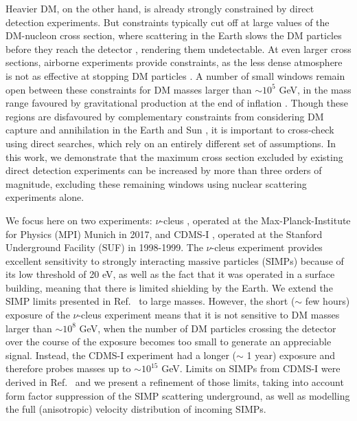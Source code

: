 \documentclass[prd,twocolumn,showpacs,nofootinbib,aps]{revtex4-1}
\begin{document}
Heavier DM, on the other hand, is already strongly constrained by direct detection experiments. But constraints typically cut off at large values of the DM-nucleon cross section, where scattering in the Earth slows the DM particles before they reach the detector \cite{Starkman:1990nj,Albuquerque:2003ei}, rendering them undetectable. At even larger cross sections, airborne experiments provide constraints, as the less dense atmosphere is not as effective at stopping DM particles \cite{Davis:2017noy}. A number of small windows remain open between these constraints for DM masses larger than $\sim10^5$ GeV, in the mass range favoured by gravitational production at the end of inflation \cite{Hui:1998dc,Allahverdi:2002nb,Kannike:2016jfs}. Though these regions are disfavoured by complementary constraints from considering DM capture and annihilation in the Earth and Sun \cite{Mack:2007xj,Albuquerque:2010bt,Mack:2012ju}, it is important to cross-check using direct searches, which rely on an entirely different set of assumptions. In this work, we demonstrate that the maximum cross section excluded by existing direct detection experiments can be increased by more than three orders of magnitude, excluding these remaining windows using nuclear scattering experiments alone.

We focus here on two experiments: $\nu$-cleus \cite{Angloher:2017sxg}, operated at the Max-Planck-Institute for Physics (MPI) Munich in 2017, and CDMS-I \cite{Abusaidi:2000wg,Abrams:2002nb}, operated at the Stanford Underground Facility (SUF) in 1998-1999. The $\nu$-cleus experiment provides excellent sensitivity to strongly interacting massive particles (SIMPs) because of its low threshold of 20 eV, as well as the fact that it was operated in a surface building, meaning that there is limited shielding by the Earth. We extend the SIMP limits presented in Ref.~\cite{Davis:2017noy} to large masses. However, the short  ($\sim$ few hours) exposure of the $\nu$-cleus experiment means that it is not sensitive to DM masses larger than $\sim10^8$ GeV, when the number of DM particles crossing the detector over the course of the exposure becomes too small to generate an appreciable signal. Instead, the CDMS-I experiment had a longer ($\sim$ 1 year) exposure and therefore probes masses up to  $\sim10^{15}$ GeV. Limits on SIMPs from CDMS-I were derived in Ref.~\cite{Albuquerque:2003ei} and we present a refinement of those limits, taking into account form factor suppression of the SIMP scattering underground, as well as modelling the full (anisotropic) velocity distribution of incoming SIMPs.
\end{document}
